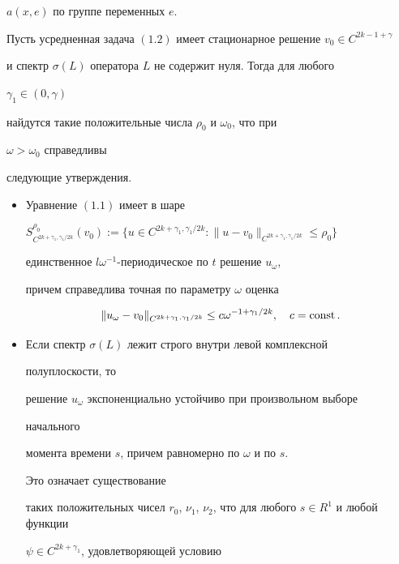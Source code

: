 $a(x,e)$ по группе переменных $e$. 


 


\begin{thm} 


Пусть усредненная задача $(1.2)$ имеет стационарное решение $v_0\in 


C^{2k-1+\gamma}$ 


и спектр $\sigma(L)$ оператора $L$ не содержит нуля. Тогда для любого 


$\gamma_1\in(0,\gamma)$ 


найдутся такие положительные числа $\rho_0$ и $\omega_0$, что при 


$\omega>\omega_0$ справедливы 


следующие утверждения. 


\begin{itemize} 


\item[1.] Уравнение $(1.1)$ имеет в шаре 


$S^{\rho_0}_{C^{2k+\gamma_1,\gamma_1/2k}}(v_0):=\{u\in 


C^{2k+\gamma_1,\gamma_1/2k}:\|u-v_0\|_{C^{2k+\gamma_1,\gamma_1/2k}}\le 


\rho_0\}$ 


единственное $l\omega^{-1}$-периодическое по $t$ решение $u_\omega$, 


причем справедлива точная по параметру $\omega$ оценка 


$$ 


\|u_\omega-v_0\|_{C^{2k+\gamma_1,\gamma_1/2k}}\le 


c\omega^{-1+\gamma_1/2k},\quad c=\const. 


$$ 


\item[2.] Если спектр $\sigma(L)$ лежит строго внутри левой комплексной 


полуплоскости, то 


решение $u_\omega$ экспоненциально устойчиво при произвольном выборе 


начального 


момента времени $s$, причем равномерно по $\omega$ и по $s$. 


Это означает существование 


таких положительных чисел $r_0$, $\nu_1$, $\nu_2$, что для любого $s\in 


R^1$ и любой функции 


$\psi\in C^{2k+\gamma_1}$, удовлетворяющей условию 



\end{itemize}
\end{thm}
